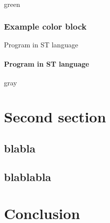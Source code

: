       \begin{colorbox}{}{green}
        
      \end{colorbox}

      \newpage
      \subsubsection{Example color block}

        \noindent \begin{exemple}{Program in ST language}
          
        \end{exemple}

        \paragraph*{Program in ST language}
        \noindent \begin{exemple*}
          
        \end{exemple*}

        \begin{colorbox}{}{gray}
          
        \end{colorbox}

  \section{Second section}

    \subsection{blabla}
    \subsection{blablabla}

  \section{Conclusion}

